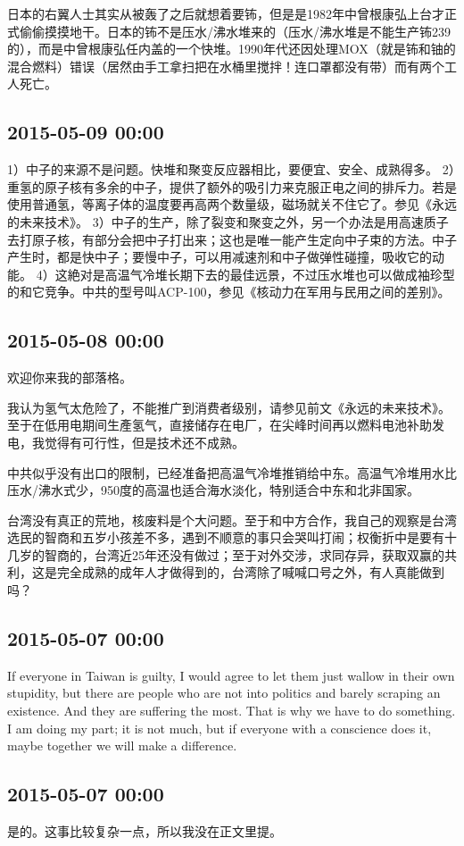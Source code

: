 \documentclass[twocolumn]{ctexart}
\begin{document}
日本的右翼人士其实从被轰了之后就想着要钸，但是是1982年中曾根康弘上台才正式偷偷摸摸地干。日本的钸不是压水/沸水堆来的（压水/沸水堆是不能生产钸239的），而是中曾根康弘任内盖的一个快堆。1990年代还因处理MOX（就是钸和铀的混合燃料）错误（居然由手工拿扫把在水桶里搅拌！连口罩都没有带）而有两个工人死亡。

\subsection*{2015-05-09 00:00}
1）中子的来源不是问题。快堆和聚变反应器相比，要便宜、安全、成熟得多。
2）重氢的原子核有多余的中子，提供了额外的吸引力来克服正电之间的排斥力。若是使用普通氢，等离子体的温度要再高两个数量级，磁场就关不住它了。参见《永远的未来技术》。
3）中子的生产，除了裂变和聚变之外，另一个办法是用高速质子去打原子核，有部分会把中子打出来；这也是唯一能产生定向中子束的方法。中子产生时，都是快中子；要慢中子，可以用减速剂和中子做弹性碰撞，吸收它的动能。
4）这絶对是高温气冷堆长期下去的最佳远景，不过压水堆也可以做成袖珍型的和它竞争。中共的型号叫ACP-100，参见《核动力在军用与民用之间的差别》。\subsection*{2015-05-08 00:00}
欢迎你来我的部落格。

我认为氢气太危险了，不能推广到消费者级别，请参见前文《永远的未来技术》。至于在低用电期间生產氢气，直接储存在电厂，在尖峰时间再以燃料电池补助发电，我觉得有可行性，但是技术还不成熟。

中共似乎没有出口的限制，已经准备把高温气冷堆推销给中东。高温气冷堆用水比压水/沸水式少，950度的高温也适合海水淡化，特别适合中东和北非国家。

台湾没有真正的荒地，核废料是个大问题。至于和中方合作，我自己的观察是台湾选民的智商和五岁小孩差不多，遇到不顺意的事只会哭叫打闹；权衡折中是要有十几岁的智商的，台湾近25年还没有做过；至于对外交涉，求同存异，获取双赢的共利，这是完全成熟的成年人才做得到的，台湾除了喊喊口号之外，有人真能做到吗？\subsection*{2015-05-07 00:00}
If everyone in Taiwan is guilty, I would agree to let them just wallow in their own stupidity, but there are people who are not into politics and barely scraping an existence. And they are suffering the most. That is why we have to do something. I am doing my part; it is not much, but if everyone with a conscience does it, maybe together we will make a difference.\subsection*{2015-05-07 00:00}
是的。这事比较复杂一点，所以我没在正文里提。
\end{document}
